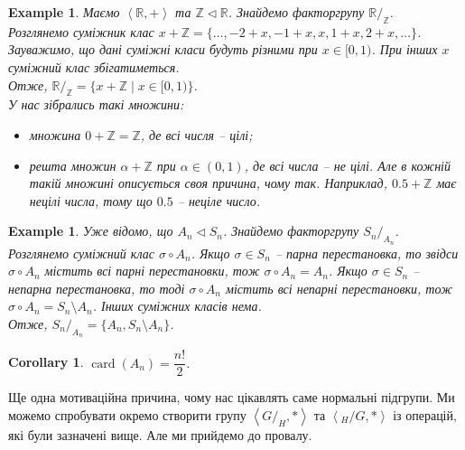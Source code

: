 \documentclass[a4paper, 10pt]{article}
\theoremstyle{theoremdd}
\theoremstyle{theoremdd}
\theoremstyle{theoremdd}
\theoremstyle{theoremdd}
\theoremstyle{theoremdd}
\newtheorem{example}[theorem]{Example}
\theoremstyle{theoremdd}
\theoremstyle{theoremdd}
\theoremstyle{theoremdd}
\theoremstyle{theoremdd}
\theoremstyle{theoremdd}
\theoremstyle{theoremdd}
\theoremstyle{theoremdd}
\theoremstyle{theoremdd}
\theoremstyle{theoremdd}
\newtheorem{corollary}[theorem]{Corollary}
\theoremstyle{theoremdd}
\DeclareMathOperator{\card}{card}
\begin{document}
\begin{example}
Маємо $\left< \mathbb{R}, + \right>$ та $\mathbb{Z} \triangleleft \mathbb{R}$. Знайдемо факторгрупу $\mathbb{R}/_{\mathbb{Z}}$.\\
Розглянемо суміжник клас $x + \mathbb{Z} = \{ \dots, -2+x, -1+x, x, 1+x, 2+x, \dots\}$. Зауважимо, що дані суміжні класи будуть різними при $x \in [0,1)$. При інших $x$ суміжний клас збігатиметься. \\
Отже, $\mathbb{R}/_{\mathbb{Z}} = \{ x + \mathbb{Z} \mid x \in [0,1) \}$.\\
У нас зібрались такі множини:
\begin{itemize}[nosep,wide=0pt,label={-}]
\item множина $0 + \mathbb{Z} = \mathbb{Z}$, де всі числя -- цілі;
\item решта множин $\alpha + \mathbb{Z}$ при $\alpha \in (0,1)$, де всі числа -- не цілі. Але в кожній такій множині описується своя причина, чому так. Наприклад, $0.5 + \mathbb{Z}$ має нецілі числа, тому що $0.5$ -- неціле число.
\end{itemize}
\end{example}

\begin{example}
Уже відомо, що $A_n \triangleleft S_n$. Знайдемо факторгрупу $S_n/_{A_n}$.\\
Розглянемо суміжний клас $\sigma \circ A_n$. Якщо $\sigma \in S_n$ -- парна перестановка, то звідси $\sigma \circ A_n$ містить всі парні перестановки, тож $\sigma \circ A_n = A_n$. Якщо $\sigma \in S_n$ -- непарна перестановка, то тоді $\sigma \circ A_n$ містить всі непарні перестановки, тож $\sigma \circ A_n = S_n \setminus A_n$. Інших суміжних класів нема.\\
Отже, $S_n/_{A_n} = \{A_n, S_n \setminus A_n\}$.
\end{example}

\begin{corollary}
$\card (A_n) = \dfrac{n!}{2}$.
\end{corollary}

Ще одна мотиваційна причина, чому нас цікавлять саме нормальні підгрупи. Ми можемо спробувати окремо створити групу $\left< G/_H, * \right>$ та $\left< {}_H/G, * \right>$ із операцій, які були зазначені вище. Але ми прийдемо до провалу.
\end{document}
